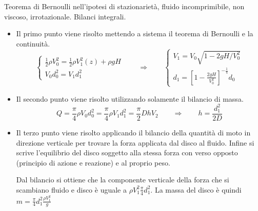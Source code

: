 \sol

\partone
 Teorema di Bernoulli nell'ipotesi di stazionarietà, fluido incomprimibile, non viscoso, irrotazionale. Bilanci integrali.
 
\parttwo
\begin{itemize}

\item Il primo punto viene risolto mettendo a sistema il teorema di Bernoulli e la 
continuità.
\begin{equation}
\begin{cases}
  \frac{1}{2} \rho V_0^2  = \frac{1}{2}\rho V_1^2(z) + \rho g H\\
  V_0 d_0^2 = V_1 d_1^2
\end{cases} \qquad \Rightarrow \qquad 
\begin{cases}
  V_1 = V_0\sqrt{1 - 2 g H / V_0^2} \\
  d_1 = \displaystyle\left[1 - \frac{2 g H}{V_0^2}\right]^{-\frac{1}{4}} d_0
\end{cases}
\end{equation}

\item Il secondo punto viene risolto utilizzando solamente il bilancio di massa.
\begin{equation}
  Q = \frac{\pi}{4} \rho V_0 d_0^2 = \frac{\pi}{4} \rho V_1 d_1^2 = \frac{\pi}{2} D h V_2 \qquad \Rightarrow \qquad h = \frac{d_1^2}{2 D}
\end{equation}

\item Il terzo punto viene risolto applicando il bilancio della quantità di moto in
direzione verticale per trovare la forza applicata dal disco al fluido. Infine si 
scrive l'equilibrio del disco soggetto alla stessa forza con verso opposto (principio
di azione e reazione) e al proprio peso.

Dal bilancio si ottiene che la componente verticale della forza che si scambiano fluido e disco è uguale a $\rho V_1^2 \frac{\pi}{4} d_1^2$. La massa del disco è quindi $m = \frac{\pi}{4} d_1^2 \frac{\rho V_1^2}{g}$

\end{itemize}





